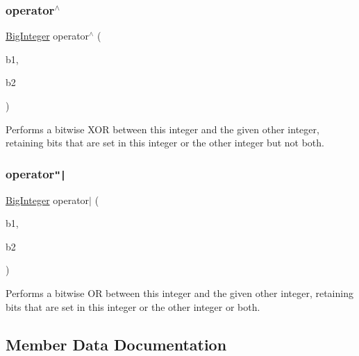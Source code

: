 \subsubsection{\texorpdfstring{operator$^\wedge$}{operator^}}
{\footnotesize\ttfamily \mbox{\hyperlink{classBigInteger}{Big\+Integer}} operator$^\wedge$ (\begin{DoxyParamCaption}\item[{const \mbox{\hyperlink{classBigInteger}{Big\+Integer}} \&}]{b1,  }\item[{const \mbox{\hyperlink{classBigInteger}{Big\+Integer}} \&}]{b2 }\end{DoxyParamCaption})\hspace{0.3cm}{\ttfamily [friend]}}



Performs a bitwise X\+OR between this integer and the given other integer, retaining bits that are set in this integer or the other integer but not both. 

\mbox{\label{classBigInteger_ac175a35da208aba1aaddbfc60742f294}} 
\subsubsection{\texorpdfstring{operator\texttt{"|}}{operator|}}
{\footnotesize\ttfamily \mbox{\hyperlink{classBigInteger}{Big\+Integer}} operator$\vert$ (\begin{DoxyParamCaption}\item[{const \mbox{\hyperlink{classBigInteger}{Big\+Integer}} \&}]{b1,  }\item[{const \mbox{\hyperlink{classBigInteger}{Big\+Integer}} \&}]{b2 }\end{DoxyParamCaption})\hspace{0.3cm}{\ttfamily [friend]}}



Performs a bitwise OR between this integer and the given other integer, retaining bits that are set in this integer or the other integer or both. 



\subsection{Member Data Documentation}
\mbox{\label{classBigInteger_aabf0cd40063eb05e429aaa0da01ab591}} 
